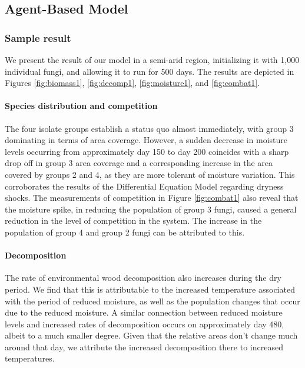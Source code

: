 \documentclass[12pt]{article}
\begin{document}
\subsection{Agent-Based Model}
\subsubsection{Sample result}
We present the result of our model in a semi-arid region, initializing it with 1,000 individual fungi, and allowing it to run for 500 days. The results are depicted in Figures \ref{fig:biomass1}, \ref{fig:decomp1}, \ref{fig:moisture1}, and \ref{fig:combat1}.

\paragraph{Species distribution and competition}
The four isolate groups establish a status quo almost immediately, with group 3 dominating in terms of area coverage. However, a sudden decrease in moisture levels occurring from approximately day 150 to day 200 coincides with a sharp drop off in group 3 area coverage and a corresponding increase in the area covered by groups 2 and 4, as they are more tolerant of moisture variation. This corroborates the results of the Differential Equation Model regarding dryness shocks. The measurements of competition in Figure \ref{fig:combat1} also reveal that the moisture spike, in reducing the population of group 3 fungi, caused a general reduction in the level of competition in the system. The increase in the population of group 4 and group 2 fungi can be attributed to this.

\paragraph{Decomposition}
The rate of environmental wood decomposition also increases during the dry period. We find that this is attributable to the increased temperature associated with the period of reduced moisture, as well as the population changes that occur due to the reduced moisture. A similar connection between reduced moisture levels and increased rates of decomposition occurs on approximately day 480, albeit to a much smaller degree. Given that the relative areas don't change much around that day, we attribute the increased decomposition there to increased temperatures.
\end{document}
